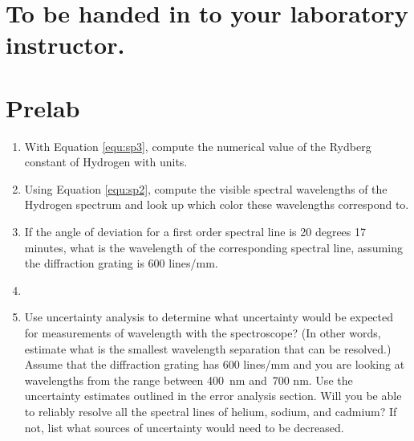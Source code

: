 \section{To be handed in to your laboratory instructor.}

\section{Prelab}

\begin{enumerate}

\item With Equation \ref{equ:sp3}, compute the numerical value of the Rydberg constant of Hydrogen with units.

\item Using Equation \ref{equ:sp2}, compute the visible spectral wavelengths of the Hydrogen spectrum and look up which color these wavelengths correspond to.

\item If the angle of deviation for a first order spectral line is 20 degrees 17 minutes, what is the wavelength of the corresponding spectral line, assuming the diffraction grating is 600 lines/mm.

\item \item Use uncertainty analysis to determine what uncertainty would be expected for measurements of wavelength with the spectroscope? (In other words, estimate what is the smallest wavelength separation that can be resolved.) Assume that the diffraction grating has 600 lines/mm and you are looking at wavelengths from the range between 400~nm and~700 nm. Use the uncertainty estimates outlined in the error analysis section. Will you be able to reliably resolve all the spectral lines of helium, sodium, and cadmium?  If not, list what sources of uncertainty would need to be decreased.

\end{enumerate}

